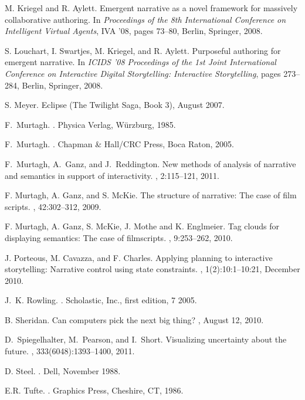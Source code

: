 \documentclass{article}
\begin{document}
\begin{thebibliography}{10}
M. Kriegel and R. Aylett.
\newblock Emergent narrative as a novel framework for massively collaborative
  authoring.
\newblock In {\em Proceedings of the 8th International Conference on
  Intelligent Virtual Agents}, IVA '08, pages 73--80, Berlin, 
  Springer, 2008.

S. Louchart, I. Swartjes, M. Kriegel, and R. Aylett.
\newblock Purposeful authoring for emergent narrative.
\newblock In {\em ICIDS '08 Proceedings of the 1st Joint International Conference on Interactive Digital Storytelling: Interactive Storytelling},
pages 273--284, Berlin, Springer, 2008. 

S. Meyer.
\newblock Eclipse (The Twilight Saga, Book 3), August 2007.

F.~Murtagh.
.
\newblock Physica Verlag, W\"urzburg, 1985.

F.~Murtagh.
.
\newblock Chapman \& Hall/CRC Press, Boca Raton,  2005.





F.~Murtagh, A.~Ganz, and J.~Reddington.
\newblock New methods of analysis of narrative and semantics in support of
  interactivity.
, 2:115--121, 2011.

F. Murtagh, A. Ganz, and S. McKie.
\newblock The structure of narrative: The case of film scripts.
, 42:302--312, 2009.

F. Murtagh, A. Ganz, S. McKie, J. Mothe and K. Englmeier.
\newblock Tag clouds for displaying semantics: The case of filmscripts. 
, 9:253--262, 2010. 

J. Porteous, M. Cavazza, and F. Charles.
\newblock Applying planning to interactive storytelling: Narrative control
  using state constraints.
, 1(2):10:1--10:21, December
  2010.

J.~K. Rowling.
.
\newblock Scholastic, Inc., first edition, 7 2005.

B. Sheridan.
\newblock Can computers pick the next big thing?
, August 12, 2010.

D.~Spiegelhalter, M.~Pearson, and I.~Short.
\newblock Visualizing uncertainty about the future.
, 333(6048):1393--1400, 2011.

D. Steel.
.
\newblock Dell, November 1988.

E.R. Tufte.
.
\newblock Graphics Press, Cheshire, CT, 1986.

\end{thebibliography}
\end{document}
